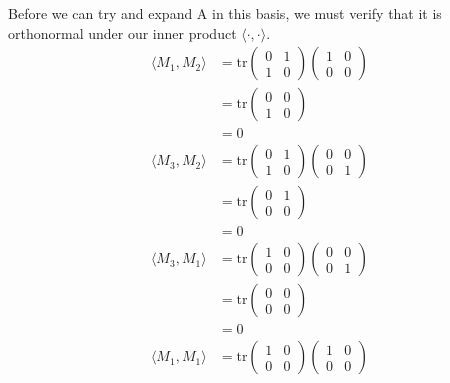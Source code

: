 \documentclass[a4paper, 11pt]{article}
\newenvironment{solution}{%
	\begin{list}{}{%
			\setlength{\topsep}{0pt}%
			\setlength{\leftmargin}{1.5cm}%
			\setlength{\rightmargin}{1.5cm}%
			\setlength{\listparindent}{\parindent}%
			\setlength{\itemindent}{\parindent}%
			\setlength{\parsep}{\parskip}%
		}%
		\item[]}{\end{list}}
\begin{document}
\begin{solution}
  \noindent Before we can try and expand A in this basis, we must verify that it is orthonormal under our inner product $\langle \cdot, \cdot \rangle$.
  \begin{align*}
    \langle M_1, M_2 \rangle &= \text{tr}\begin{pmatrix}0 & 1 \\ 1 & 0\end{pmatrix}\begin{pmatrix}1 & 0 \\ 0 & 0 \end{pmatrix} \\
      &=\text{tr}\begin{pmatrix} 0 & 0 \\ 1 & 0 \end{pmatrix} \\
      &= 0 
  \end{align*}
  \begin{align*}
    \langle M_3, M_2 \rangle &= \text{tr}\begin{pmatrix}0 & 1 \\ 1 & 0\end{pmatrix}\begin{pmatrix}0 & 0 \\ 0 & 1 \end{pmatrix} \\
      &=\text{tr}\begin{pmatrix} 0 & 1 \\ 0 & 0 \end{pmatrix} \\
      &= 0 
  \end{align*}
  \begin{align*}
    \langle M_3, M_1 \rangle &= \text{tr}\begin{pmatrix}1 & 0 \\ 0 & 0\end{pmatrix}\begin{pmatrix}0 & 0 \\ 0 & 1 \end{pmatrix} \\
      &=\text{tr}\begin{pmatrix} 0 & 0 \\ 0 & 0 \end{pmatrix} \\
      &= 0 
  \end{align*}
\begin{align*}
    \langle M_1, M_1 \rangle &= \text{tr}\begin{pmatrix}1 & 0 \\ 0 & 0\end{pmatrix}\begin{pmatrix}1 & 0 \\ 0 & 0 \end{pmatrix} \\

\end{align*}
\end{solution}
\end{document}
